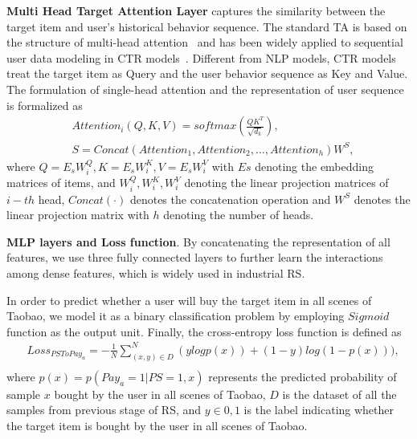 \documentclass[sigconf]{acmart}
\begin{document}
\textbf{Multi Head Target Attention Layer} captures the similarity between the target item and user's historical behavior sequence. The standard TA is based on the structure of multi-head attention~\cite{2017Attention} and has been widely applied to sequential user data modeling in CTR models~\cite{2017CTRTA,2020CTRTA,2020CAN}. Different from NLP models, CTR models treat the target item as Query and the user behavior sequence as Key and Value. The formulation of single-head attention and the representation of user sequence is formalized as
{\setlength\abovedisplayskip{0pt}
\begin{equation}
\begin{aligned}
    & Attention_i(Q, K, V) = softmax(\frac{QK^{T}}{\sqrt{d_k}}), \\
    & S = Concat(Attention_1, Attention_2, \dots, Attention_h)W^S,
\end{aligned}
\end{equation}
\setlength\belowdisplayskip{0pt}} where $Q=E_sW_i^Q, K=E_sW_i^K, V=E_sW_i^V$ with $Es$ denoting the embedding matrices of items, and $W_i^Q, W_i^K, W_i^V$ denoting the linear projection matrices of $i-th$ head, $Concat(\cdot)$ denotes the concatenation operation and $W^S$ denotes the linear projection matrix with $h$ denoting the number of heads.

\textbf{MLP layers and Loss function}. By concatenating the representation of all features, we use three fully connected layers to further learn the interactions among dense features, which is widely used in industrial RS.

In order to predict whether a user will buy the target item in all scenes of Taobao, we model it as a binary classification problem by employing $Sigmoid$ function as the output unit. Finally, the cross-entropy loss function is defined as 
{\setlength\abovedisplayskip{0pt}
\begin{equation}
\begin{aligned}
    &Loss_{PSToPay_a} = - \frac{1}{N} \sum_{(x,y) \in D}^N (ylogp(x)) + (1-y)log(1-p(x))), \\ 
\end{aligned}
\end{equation}
\setlength\belowdisplayskip{0pt}} where $p(x)=p(Pay_a=1|PS=1, x)$ represents the predicted probability of sample $x$ bought by the user in all scenes of Taobao, $D$ is the dataset of all the samples from previous stage of RS, and $y \in {0, 1}$ is the label indicating whether the target item is bought by the user in all scenes of Taobao.
\end{document}
